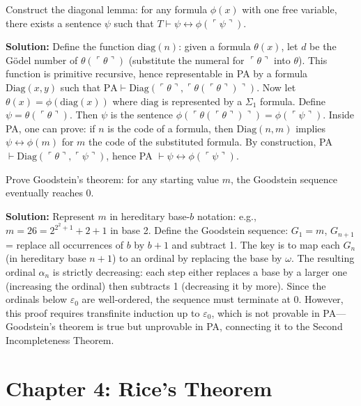 \begin{exercise}[Advanced]
Construct the diagonal lemma: for any formula $\phi(x)$ with one free variable, there exists a sentence $\psi$ such that $T \vdash \psi \leftrightarrow \phi(\ulcorner \psi \urcorner)$.
\end{exercise}
\textbf{Solution:} Define the function $\mathrm{diag}(n)$: given a formula $\theta(x)$, let $d$ be the G\"odel number of $\theta(\ulcorner \theta \urcorner)$ (substitute the numeral for $\ulcorner \theta \urcorner$ into $\theta$). This function is primitive recursive, hence representable in PA by a formula $\mathrm{Diag}(x,y)$ such that $\mathrm{PA} \vdash \mathrm{Diag}(\ulcorner \theta \urcorner, \ulcorner \theta(\ulcorner \theta \urcorner) \urcorner)$. Now let $\theta(x) = \phi(\mathrm{diag}(x))$ where $\mathrm{diag}$ is represented by a $\Sigma_1$ formula. Define $\psi = \theta(\ulcorner \theta \urcorner)$. Then $\psi$ is the sentence $\phi(\ulcorner \theta(\ulcorner \theta \urcorner) \urcorner) = \phi(\ulcorner \psi \urcorner)$. Inside PA, one can prove: if $n$ is the code of a formula, then $\mathrm{Diag}(n, m)$ implies $\psi \leftrightarrow \phi(m)$ for $m$ the code of the substituted formula. By construction, PA $\vdash \mathrm{Diag}(\ulcorner \theta \urcorner, \ulcorner \psi \urcorner)$, hence PA $\vdash \psi \leftrightarrow \phi(\ulcorner \psi \urcorner)$.

\begin{exercise}[Challenge]
Prove Goodstein's theorem: for any starting value $m$, the Goodstein sequence eventually reaches 0.
\end{exercise}
\textbf{Solution:} Represent $m$ in hereditary base-$b$ notation: e.g., $m = 26 = 2^{2^2 + 1} + 2 + 1$ in base 2. Define the Goodstein sequence: $G_1 = m$, $G_{n+1}$ = replace all occurrences of $b$ by $b+1$ and subtract 1. The key is to map each $G_n$ (in hereditary base $n+1$) to an ordinal by replacing the base by $\omega$. The resulting ordinal $\alpha_n$ is strictly decreasing: each step either replaces a base by a larger one (increasing the ordinal) then subtracts 1 (decreasing it by more). Since the ordinals below $\varepsilon_0$ are well-ordered, the sequence must terminate at 0. However, this proof requires transfinite induction up to $\varepsilon_0$, which is not provable in PA---Goodstein's theorem is true but unprovable in PA, connecting it to the Second Incompleteness Theorem.

\section{Chapter 4: Rice's Theorem}

